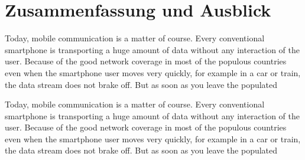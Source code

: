 
\chapter{Zusammenfassung und Ausblick}

Today, mobile communication is a matter of course. Every conventional 
smartphone is transporting a huge amount of data without any interaction of the
user. Because of the good network coverage in most of the populous countries
even when the smartphone user moves very quickly, for example in a car or train,
the data stream does not brake off. But as soon as you leave the populated

Today, mobile communication is a matter of course. Every conventional
smartphone is transporting a huge amount of data without any interaction of the
user. Because of the good network coverage in most of the populous countries
even when the smartphone user moves very quickly, for example in a car or train,
the data stream does not brake off. But as soon as you leave the populated

\clearpage
